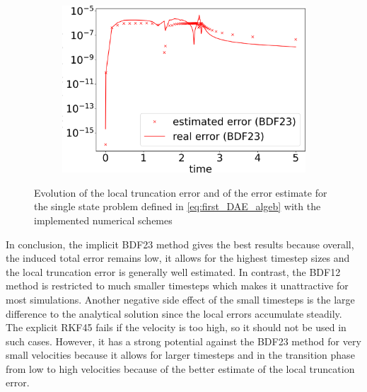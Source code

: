\documentclass{report}
\begin{document}
\begin{figure}[H]
\begin{subfigure}{0.32\textwidth}
    	\includegraphics[width=1\textwidth]{images/errorEstimateBDF23.png}
        \label{fig:errorEstimateEvolutionBDF23}
    \end{subfigure}
    \caption{Evolution of the local truncation error and of the error estimate for the single state problem defined in \autoref{eq:first_DAE_algeb} with the implemented numerical schemes}
    \label{fig:errorEstimateEvolutionALL}
\end{figure}

In conclusion, the implicit BDF23 method gives the best results because overall, the induced total error remains low, it allows for the highest timestep sizes and the local truncation error is generally well estimated. In contrast, the BDF12 method is restricted to much smaller timesteps which makes it unattractive for most simulations. Another negative side effect of the small timesteps is the large difference to the analytical solution since the local errors accumulate steadily. The explicit RKF45 fails if the velocity is too high, so it should not be used in such cases. However, it has a strong potential against the BDF23 method for very small velocities because it allows for larger timesteps and in the transition phase from low to high velocities because of the better estimate of the local truncation error.
\end{document}
